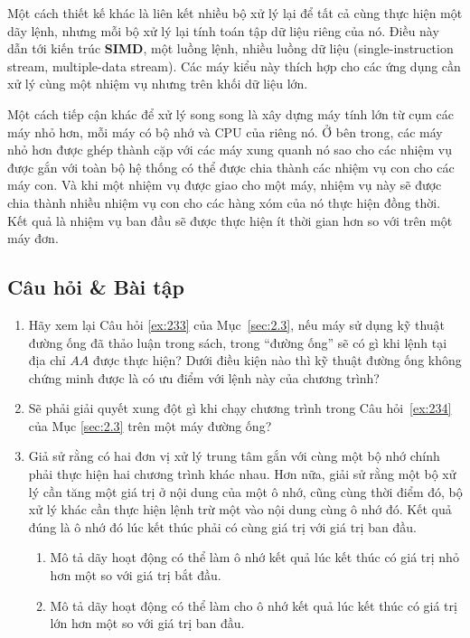 Một cách thiết kế khác là liên kết nhiều bộ xử lý lại để tất cả cùng thực hiện một dãy
lệnh, nhưng mỗi bộ xử lý lại tính toán tập dữ liệu riêng của nó. Điều này dẫn tới kiến
trúc \textbf{SIMD}, một luồng lệnh, nhiều luồng dữ liệu (single-instruction stream,
multiple-data stream).  Các máy kiểu này thích hợp cho các ứng dụng cần xử lý cùng một
nhiệm vụ nhưng trên khối dữ liệu lớn.

Một cách tiếp cận khác để xử lý song song là xây dựng máy tính lớn từ cụm các máy nhỏ hơn,
mỗi máy có bộ nhớ và CPU của riêng nó. Ở bên trong, các máy nhỏ hơn được ghép thành cặp
với các máy xung quanh nó sao cho các nhiệm vụ được gắn với toàn bộ hệ thống có thể được
chia thành các nhiệm vụ con cho các máy con. Và khi một nhiệm vụ được giao cho một máy,
nhiệm vụ này sẽ được chia thành nhiều nhiệm vụ con cho các hàng xóm của nó thực hiện đồng
thời. Kết quả là nhiệm vụ ban đầu sẽ được thực hiện ít thời gian hơn so với trên một máy
đơn.

\subsection*{Câu hỏi \& Bài tập}
\begin{enumerate}
\item Hãy xem lại Câu hỏi \ref{ex:233} của Mục~\ref{sec:2.3}, nếu máy sử dụng kỹ thuật
  đường ống đã thảo luận trong sách, trong ``đường ống'' sẽ có gì khi lệnh tại địa chỉ
  $AA$ được thực hiện?  Dưới điều kiện nào thì kỹ thuật đường ống không chứng minh được là
  có ưu điểm với lệnh này của chương trình?

\item Sẽ phải giải quyết xung đột gì khi chạy chương trình trong Câu hỏi~\ref{ex:234} của
  Mục \ref{sec:2.3} trên một máy đường ống?

\item Giả sử rằng có hai đơn vị xử lý trung tâm gắn với cùng một bộ nhớ chính phải thực
  hiện hai chương trình khác nhau. Hơn nữa, giải sử rằng một bộ xử lý cần tăng một giá trị
  ở nội dung của một ô nhớ, cũng cùng thời điểm đó, bộ xử lý khác cần thực hiện lệnh trừ
  một vào nội dung cùng ô nhớ đó. Kết quả đúng là ô nhớ đó lúc kết thúc phải có cùng giá
  trị với giá trị ban đầu.

  \begin{enumerate}
  \item Mô tả dãy hoạt động có thể làm ô nhớ kết quả lúc kết thúc có giá trị nhỏ hơn một
    so với giá trị bắt đầu.

  \item Mô tả dãy hoạt động có thể làm cho ô nhớ kết quả lúc kết thúc có giá trị lớn hơn
    một so với giá trị ban đầu.
  \end{enumerate}
\end{enumerate}
 
